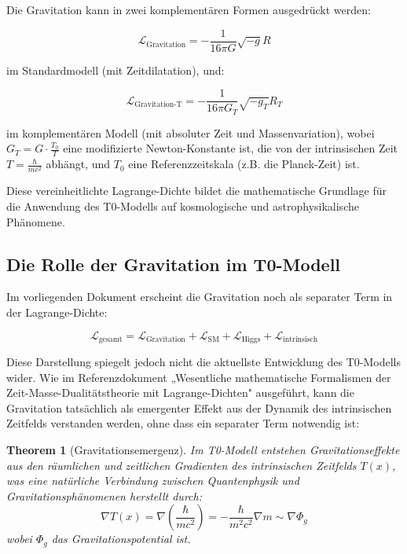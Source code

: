 \documentclass[a4paper,12pt]{article}
\newtheorem{theorem}{Theorem}
\theoremstyle{definition}
\theoremstyle{remark}
\begin{document}
	Die Gravitation kann in zwei komplementären Formen ausgedrückt werden:
	
	\begin{equation}
		\mathcal{L}_\text{Gravitation} = -\frac{1}{16\pi G} \sqrt{-g} R
	\end{equation}
	
	im Standardmodell (mit Zeitdilatation), und:
	
	\begin{equation}
		\mathcal{L}_\text{Gravitation-T} = -\frac{1}{16\pi G_T} \sqrt{-g_T} R_T
	\end{equation}
	
	im komplementären Modell (mit absoluter Zeit und Massenvariation), wobei $G_T = G \cdot \frac{T_0}{T}$ eine modifizierte Newton-Konstante ist, die von der intrinsischen Zeit $T = \frac{\hbar}{mc^2}$ abhängt, und $T_0$ eine Referenzzeitskala (z.B. die Planck-Zeit) ist.
	
	Diese vereinheitlichte Lagrange-Dichte bildet die mathematische Grundlage für die Anwendung des T0-Modells auf kosmologische und astrophysikalische Phänomene.
	
	\newcommand{\Tfield}{T(x)} %
	
	\subsection{Die Rolle der Gravitation im T0-Modell}
	
	Im vorliegenden Dokument erscheint die Gravitation noch als separater Term in der Lagrange-Dichte:
	
	\begin{equation}
		\mathcal{L}_\text{gesamt} = \mathcal{L}_\text{Gravitation} + \mathcal{L}_\text{SM} + \mathcal{L}_\text{Higgs} + \mathcal{L}_\text{intrinsisch}
	\end{equation}
	
	Diese Darstellung spiegelt jedoch nicht die aktuellste Entwicklung des T0-Modells wider. Wie im Referenzdokument „Wesentliche mathematische Formalismen der Zeit-Masse-Dualitätstheorie mit Lagrange-Dichten" ausgeführt, kann die Gravitation tatsächlich als emergenter Effekt aus der Dynamik des intrinsischen Zeitfelds verstanden werden, ohne dass ein separater Term notwendig ist:
	
	\begin{theorem}[Gravitationsemergenz]
		Im T0-Modell entstehen Gravitationseffekte aus den räumlichen und zeitlichen Gradienten des intrinsischen Zeitfelds $\Tfield$, was eine natürliche Verbindung zwischen Quantenphysik und Gravitationsphänomenen herstellt durch:
		\begin{equation}
			\nabla \Tfield = \nabla \left(\frac{\hbar}{mc^2}\right) = -\frac{\hbar}{m^2c^2}\nabla m \sim \nabla \Phi_g
		\end{equation}
		wobei $\Phi_g$ das Gravitationspotential ist.
	\end{theorem}
	
\end{document}
